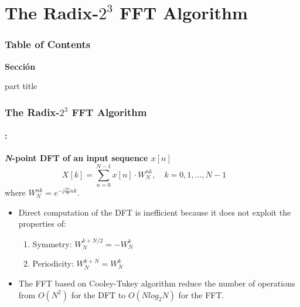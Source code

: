 \section{The Radix-$2^3$ FFT  Algorithm}
\begin{frame}
  \frametitle{\textbf{Table of Contents}}
  \begin{center}
    {\vspace{-1.5cm}\Large \textbf{Sección \thesection}\vspace{0.5cm}}
    \begin{beamercolorbox}[
      sep=8pt,center]{part title}
      \textbf{\insertsection}
    \end{beamercolorbox}
  \end{center}
\end{frame}

\begin{frame}
	\frametitle{\textbf{The Radix-$2^3$ FFT  Algorithm}}
	\framesubtitle{\secname : \subsecname}
	\begin{block}{\centering \textbf{\textit{N}-point DFT of an input sequence $x[n]$}}
		\begin{equation}
			X[k] = \sum_{n=0}^{N-1} x[n] \cdot W_N^{nk}, \quad k=0,1,...,N-1 \qquad
		\end{equation}
		where $W_N^{nk} = e^{-j\frac{2\pi}{N} nk}$. 
	\end{block}
	
	\begin{block}{\centering}
		\begin{itemize}\justifying\footnotesize
			\item Direct computation of the DFT is inefficient because it does not exploit the properties of:
			\begin{enumerate}
				\item Symmetry: $ W_N^{k+N/2} = -W_N^k$
				\item Periodicity:  $W_N^{k+N} = W_N^k$
			\end{enumerate}
			\item The FFT based on Cooley-Tukey algorithm reduce the number of operations from $O(N^2)$ for the DFT to $O(Nlog_2N)$ for the FFT.
		\end{itemize}	
	\end{block}
\end{frame}



